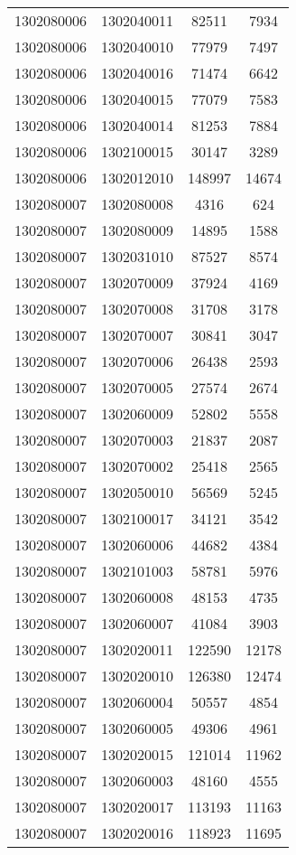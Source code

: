 \begin{longtable}[h]{llcc}
		1302080006 & 1302040011 & 82511 & 7934\\
		1302080006 & 1302040010 & 77979 & 7497\\
		1302080006 & 1302040016 & 71474 & 6642\\
		1302080006 & 1302040015 & 77079 & 7583\\
		1302080006 & 1302040014 & 81253 & 7884\\
		1302080006 & 1302100015 & 30147 & 3289\\
		1302080006 & 1302012010 & 148997 & 14674\\
		1302080007 & 1302080008 & 4316 & 624\\
		1302080007 & 1302080009 & 14895 & 1588\\
		1302080007 & 1302031010 & 87527 & 8574\\
		1302080007 & 1302070009 & 37924 & 4169\\
		1302080007 & 1302070008 & 31708 & 3178\\
		1302080007 & 1302070007 & 30841 & 3047\\
		1302080007 & 1302070006 & 26438 & 2593\\
		1302080007 & 1302070005 & 27574 & 2674\\
		1302080007 & 1302060009 & 52802 & 5558\\
		1302080007 & 1302070003 & 21837 & 2087\\
		1302080007 & 1302070002 & 25418 & 2565\\
		1302080007 & 1302050010 & 56569 & 5245\\
		1302080007 & 1302100017 & 34121 & 3542\\
		1302080007 & 1302060006 & 44682 & 4384\\
		1302080007 & 1302101003 & 58781 & 5976\\
		1302080007 & 1302060008 & 48153 & 4735\\
		1302080007 & 1302060007 & 41084 & 3903\\
		1302080007 & 1302020011 & 122590 & 12178\\
		1302080007 & 1302020010 & 126380 & 12474\\
		1302080007 & 1302060004 & 50557 & 4854\\
		1302080007 & 1302060005 & 49306 & 4961\\
		1302080007 & 1302020015 & 121014 & 11962\\
		1302080007 & 1302060003 & 48160 & 4555\\
		1302080007 & 1302020017 & 113193 & 11163\\
		1302080007 & 1302020016 & 118923 & 11695\\

\end{longtable}
